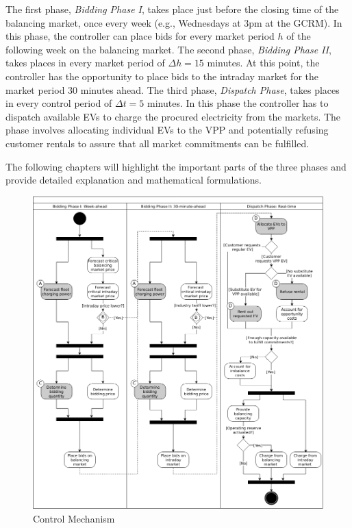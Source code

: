 \documentclass[a4paper, 12pt]{article}
\begin{document}
The first phase, \emph{Bidding Phase I}, takes place just before the closing time of
the balancing market, once every week (e.g., Wednesdays at 3pm at the GCRM). In
this phase, the controller can place bids for every market period \(h\) of the
following week on the balancing market. The second phase, \emph{Bidding Phase II},
takes places in every market period of \(\Delta{h}\!=\!15\) minutes. At this
point, the controller has the opportunity to place bids to the intraday market
for the market period 30 minutes ahead. The third phase, \emph{Dispatch Phase}, takes
places in every control period of \(\Delta{t}\!=\!5\) minutes. In this phase the
controller has to dispatch available EVs to charge the procured electricity from
the markets. The phase involves allocating individual EVs to the VPP and
potentially refusing customer rentals to assure that all market commitments can
be fulfilled.

The following chapters will highlight the important parts of the three phases
and provide detailed explanation and mathematical formulations.

\begin{figure}[p]
\centering
\includegraphics[width=1.05\linewidth]{fig/control_mechanism.png}
\caption[Control Mechanism]{Control Mechanism \label{fig-control-mechanism}}
\end{figure}
\end{document}
